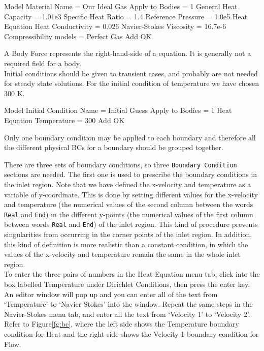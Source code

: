 \ttbegin
Model
  Material
   Name = Our Ideal Gas
    Apply to Bodies = 1 
    General
      Heat Capacity = 1.01e3
      Specific Heat Ratio = 1.4
      Reference Pressure = 1.0e5
    Heat Equation
      Heat Conductivity = 0.026
    Navier-Stokes
       Viscosity = 16.7e-6
       Compressibility models = Perfect Gas
    Add
    OK
\ttend

A Body Force represents the right-hand-side of a equation. It is generally not a required field for a body.\\

Initial conditions should be given to transient cases, and probably are not needed for steady state solutions.  For the initial condition of temperature we have chosen 300 K.

\ttbegin
Model
  Initial Condition 
    Name = Initial Guess
    Apply to Bodies = 1 
    Heat Equation
      Temperature = 300
    Add 
    OK
\ttend

Only one boundary condition may be applied to each boundary and therefore all the different physical BCs for a boundary should be grouped together. 

There are three sets of boundary conditions, so three {\tt Boundary Condition} sections are needed. The first one is used to prescribe the boundary conditions in the inlet region. Note that we have defined the x-velocity and temperature as a variable of y-coordinate.  This is done by setting different values for the x-velocity and temperature (the numerical values of the second column between the words {\tt Real} and {\tt End}) in the different y-points (the numerical values of the first column between words {\tt Real} and {\tt End}) of the inlet region. This kind of procedure prevents singularities from occurring in the corner points of the inlet region. In addition, this kind of definition is more realistic than a constant condition, in which the values of the x-velocity and temperature remain the same in the whole inlet region.\\

To enter the three pairs of numbers in the Heat Equation menu tab, click into the box labelled Temperature under Dirichlet Conditions, then press the enter key.  An editor window will pop up and you can enter all of the text from `Temperature' to `Navier-Stokes' into the window.  Repeat the same steps in the Navier-Stokes menu tab, and enter all the text from `Velocity 1' to `Velocity 2'.    Refer to Figure\ref{fg:bc}, where the left side shows the Temperature boundary condition for Heat and the right side shows the Velocity 1 boundary condition for Flow.

